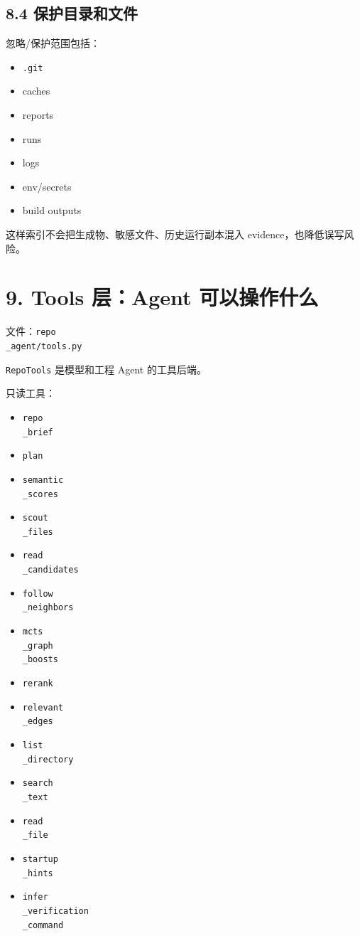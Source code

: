 \documentclass[UTF8,12pt,openany]{ctexbook}
\begin{document}
\subsection{8.4 保护目录和文件}

忽略/保护范围包括：\par

\begin{itemize}
\item \texttt{.git}
\item caches
\item reports
\item runs
\item logs
\item env/secrets
\item build outputs
\end{itemize}

这样索引不会把生成物、敏感文件、历史运行副本混入 evidence，也降低误写风险。\par

\section{9. Tools 层：Agent 可以操作什么}

文件：\texttt{repo\\_agent/tools.py}\par

\texttt{RepoTools} 是模型和工程 Agent 的工具后端。\par

只读工具：\par

\begin{itemize}
\item \texttt{repo\\_brief}
\item \texttt{plan}
\item \texttt{semantic\\_scores}
\item \texttt{scout\\_files}
\item \texttt{read\\_candidates}
\item \texttt{follow\\_neighbors}
\item \texttt{mcts\\_graph\\_boosts}
\item \texttt{rerank}
\item \texttt{relevant\\_edges}
\item \texttt{list\\_directory}
\item \texttt{search\\_text}
\item \texttt{read\\_file}
\item \texttt{startup\\_hints}
\item \texttt{infer\\_verification\\_command}
\end{itemize}
\end{document}
